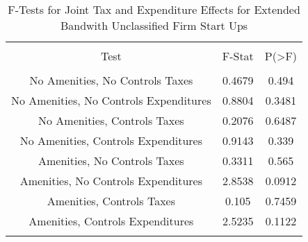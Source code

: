 
\begin{table}[!htbp] \centering 
  \caption{F-Tests for Joint Tax and Expenditure Effects for Extended Bandwith Unclassified Firm Start Ups} 
  \label{99Ftests} 
\begin{tabular}{@{\extracolsep{5pt}} ccc} 
\\[-1.8ex]\hline 
\hline \\[-1.8ex] 
Test & F-Stat & P(\textgreater F) \\ 
\hline \\[-1.8ex] 
No Amenities, No Controls Taxes & 0.4679 & 0.494 \\ 
No Amenities, No Controls Expenditures & 0.8804 & 0.3481 \\ 
No Amenities, Controls Taxes & 0.2076 & 0.6487 \\ 
No Amenities, Controls Expenditures & 0.9143 & 0.339 \\ 
Amenities, No Controls Taxes & 0.3311 & 0.565 \\ 
Amenities, No Controls Expenditures & 2.8538 & 0.0912 \\ 
Amenities, Controls Taxes & 0.105 & 0.7459 \\ 
Amenities, Controls Expenditures & 2.5235 & 0.1122 \\ 
\hline \\[-1.8ex] 
\end{tabular} 
\end{table} 
